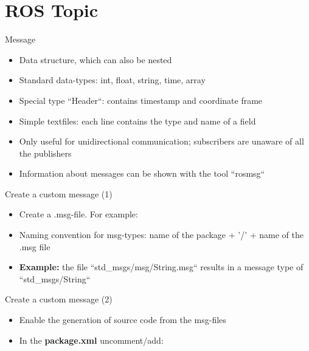 \documentclass{beamer}
\begin{document}
\section{ROS Topic}
\begin{frame}{Message}
	\begin{itemize}
		\item Data structure, which can also be nested
		\item Standard data-types: int, float, string, time, array
		\item Special type ``Header``: contains timestamp and coordinate frame
		\item Simple textfiles: each line contains the type and name of a field
		\item Only useful for unidirectional communication; subscribers are unaware of all the publishers
		\item Information about messages can be shown with the tool ``rosmsg``
	\end{itemize}
\end{frame}
\begin{frame}{Create a custom message (1)}
	\begin{itemize}
		\item Create a .msg-file. For example:
		
		\item Naming convention for msg-types: name of the package + '/' + name of the .msg file\\
		\item \textbf{Example:} the file ``std\_msgs/msg/String.msg`` results in a message type of ``std\_msgs/String``
	\end{itemize}
\end{frame}
\begin{frame}{Create a custom message (2)}
	\begin{itemize}
		\item Enable the generation of source code from the msg-files
		\item In the \textbf{package.xml} uncomment/add:
	\end{itemize}
	
	

\end{frame}
\end{document}

